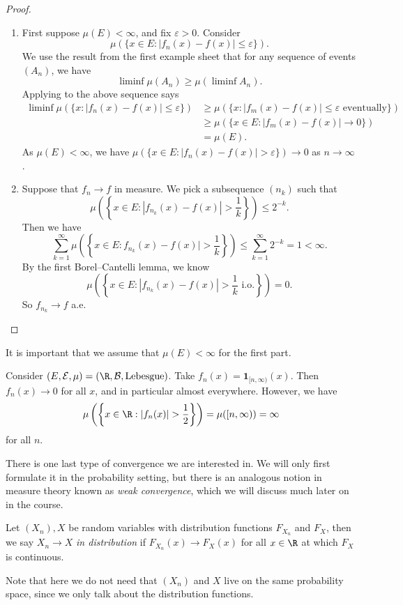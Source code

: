 \documentclass[a4paper]{article}
\begin{document}
\begin{proof}\leavevmode
  \begin{enumerate}
    \item First suppose $\mu(E) < \infty$, and fix $\varepsilon > 0$. Consider
      \[
        \mu(\{x \in E: |f_n(x) - f(x)|\leq \varepsilon\}).
      \]
      We use the result from the first example sheet that for any sequence of events $(A_n)$, we have
      \[
        \liminf \mu(A_n) \geq \mu(\liminf A_n).
      \]
      Applying to the above sequence says
      \begin{align*}
        \liminf \mu(\{x: |f_n(x) - f(x)|\leq \varepsilon\}) &\geq \mu(\{x: |f_m (x) - f(x)| \leq \varepsilon\text{ eventually}\})\\
        &\geq \mu(\{x \in E: |f_m(x) - f(x)| \to 0\})\\
        &= \mu(E).
      \end{align*}
      As $\mu(E) < \infty$, we have $\mu(\{x \in E: |f_n(x) - f(x)| > \varepsilon\}) \to 0$ as $n \to \infty$.

    \item Suppose that $f_n \to f$ in measure. We pick a subsequence $(n_k)$ such that
      \[
        \mu\left(\left\{x \in E: |f_{n_k}(x) - f(x)| > \frac{1}{k}\right\}\right) \leq 2^{-k}.
      \]
      Then we have
      \[
        \sum_{k = 1}^\infty \mu\left(\left\{x \in E: f_{n_k}(x) - f(x)|> \frac{1}{k}\right\}\right) \leq \sum_{k = 1}^\infty 2^{-k} = 1 < \infty.
      \]
      By the first Borel--Cantelli lemma, we know
      \[
        \mu\left(\left\{x \in E: |f_{n_k}(x) - f(x)| > \frac{1}{k} \text{ i.o.}\right\}\right) = 0.
      \]
      So $f_{n_k} \to f$ a.e.
  \end{enumerate}
\end{proof}
It is important that we assume that $\mu(E) < \infty$ for the first part.
\begin{eg}
  Consider $(E, \mathcal{E}, \mu) = (\R, \mathcal{B}, \text{Lebesgue})$. Take $f_n(x) = \mathbf{1}_{[n, \infty)}(x)$. Then $f_n(x) \to 0$ for all $x$, and in particular almost everywhere. However, we have
  \[
    \mu\left(\left\{x \in \R: |f_n(x)| > \frac{1}{2}\right\}\right) = \mu([n, \infty)) = \infty
  \]
  for all $n$.
\end{eg}

There is one last type of convergence we are interested in. We will only first formulate it in the probability setting, but there is an analogous notion in measure theory known as \emph{weak convergence}, which we will discuss much later on in the course.
\begin{defi}
  Let $(X_n), X$ be random variables with distribution functions $F_{X_n}$ and $F_X$, then we say $X_n \to X$ \emph{in distribution} if $F_{X_n}(x) \to F_X(x)$ for all $x \in \R$ at which $F_X$ is continuous.
\end{defi}
Note that here we do not need that $(X_n)$ and $X$ live on the same probability space, since we only talk about the distribution functions.
\end{document}
